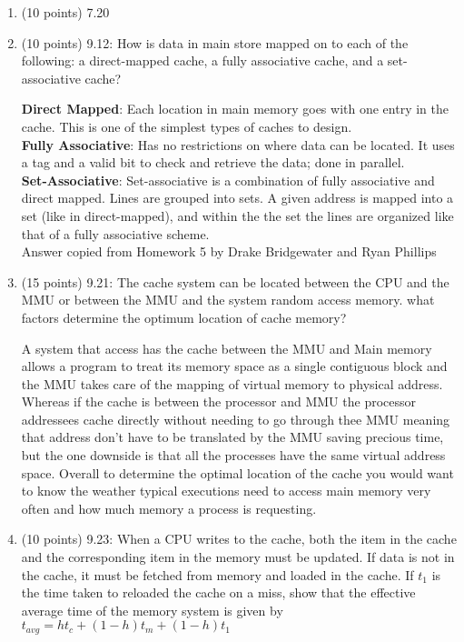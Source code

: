 \documentclass[letterpaper,10pt,onecolumn,titlepage]{article}
\begin{document}
\begin{enumerate}
\item (10 points) 7.20
\begin{mdframed}[style=MyFrame, backgroundcolor=red]

\end{mdframed}

\item (10 points) 9.12: How is data in main store mapped on to each of the following: a direct-mapped cache, a fully associative cache, and a set-associative cache? 

\begin{mdframed}[style=MyFrame]
\textbf{Direct Mapped}: Each location in main memory goes with one entry in the cache. This is one of the simplest types of caches to design.\\
\textbf{Fully Associative}: Has no restrictions on where data can be located. It uses a tag and a valid bit to check and retrieve the data; done in parallel. \\
\textbf{Set-Associative}: Set-associative is a combination of fully associative and direct mapped. Lines are grouped into sets. A given address is mapped into a set (like in direct-mapped), and within the the set the lines are organized like that of a fully associative scheme. \\
Answer copied from Homework 5 by Drake Bridgewater and Ryan Phillips \cite{HW5}
\end{mdframed}
\item (15 points) 9.21: The cache system can be located between the CPU and the MMU or between the MMU and the system random access memory. what factors determine the optimum location of cache memory?
\begin{mdframed}[style=MyFrame]
A system that access has the cache between the MMU and Main memory allows a program to treat its memory space as a single contiguous block and the MMU takes care of the mapping of virtual memory to physical address.  Whereas if the cache is between the processor and MMU the processor addressees cache directly without needing to go through thee MMU meaning that address don't have to be translated by the MMU saving precious time, but the one downside is that all the processes have the same virtual address space. Overall to determine the optimal location of the cache you would want to know the weather typical executions need to access main memory very often and how much memory a process is requesting. 
\end{mdframed}

\item (10 points) 9.23: When a CPU  writes to the cache, both the item in the cache and the corresponding item in the memory must be updated. If data is not in the cache, it must be fetched from memory and loaded in the cache. If $t_1$ is the time taken to reloaded the cache on a miss, show that the effective average time of the memory system is given by $t_{avg}=ht_c+(1-h)t_m+(1-h)t_1$


\end{enumerate}
\end{document}
